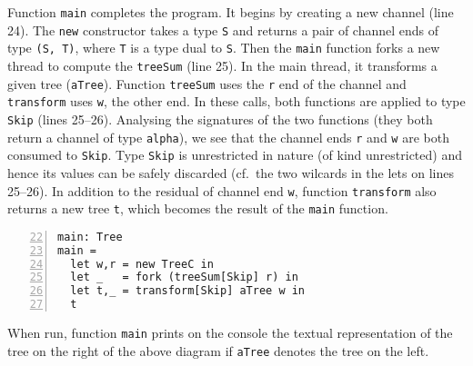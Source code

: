 Function \lstinline|main| completes the program. It begins by creating
a new channel (line 24). The \lstinline|new| constructor takes a type
\lstinline|S| and returns a pair of channel ends of type
\lstinline|(S, T)|, where \lstinline|T| is a type dual to
\lstinline|S|. Then the \lstinline|main| function forks a new thread
to compute the \lstinline|treeSum| (line 25). In the main thread, it
transforms a given tree (\lstinline|aTree|). Function
\lstinline|treeSum| uses the \lstinline|r| end of the channel and
\lstinline|transform| uses \lstinline|w|, the other end. In these
calls, both functions are applied to type \lstinline|Skip| (lines
25--26). Analysing the signatures of the two functions (they both
return a channel of type \lstinline|alpha|), we see that the channel
ends \lstinline|r| and \lstinline|w| are both consumed to
\lstinline|Skip|. Type \lstinline|Skip| is unrestricted in nature (of
kind unrestricted) and hence its values can be safely discarded (cf.\
the two wilcards in the lets on lines 25--26). In addition to the
residual of channel end \lstinline|w|, function \lstinline|transform|
also returns a new tree \lstinline|t|, which becomes the result of the
\lstinline|main| function.
%
\begin{lstlisting}[numbers=left,firstnumber=22]
main: Tree
main =
  let w,r = new TreeC in
  let _   = fork (treeSum[Skip] r) in
  let t,_ = transform[Skip] aTree w in
  t
\end{lstlisting}

When run, function \lstinline|main| prints on the console the textual
representation of the tree on the right of the above diagram if
\lstinline|aTree| denotes the tree on the left.

